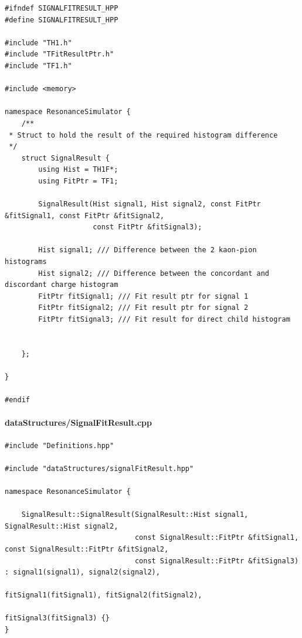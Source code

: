 \documentclass[12pt, a4paper]{article}
\begin{document}
\begin{verbatim}
#ifndef SIGNALFITRESULT_HPP
#define SIGNALFITRESULT_HPP

#include "TH1.h"
#include "TFitResultPtr.h"
#include "TF1.h"

#include <memory>

namespace ResonanceSimulator {
    /**
 * Struct to hold the result of the required histogram difference
 */
    struct SignalResult {
        using Hist = TH1F*;
        using FitPtr = TF1;

        SignalResult(Hist signal1, Hist signal2, const FitPtr &fitSignal1, const FitPtr &fitSignal2,
                     const FitPtr &fitSignal3);

        Hist signal1; /// Difference between the 2 kaon-pion histograms
        Hist signal2; /// Difference between the concordant and discordant charge histogram
        FitPtr fitSignal1; /// Fit result ptr for signal 1
        FitPtr fitSignal2; /// Fit result ptr for signal 2
        FitPtr fitSignal3; /// Fit result for direct child histogram


    };

}

#endif
\end{verbatim}

\paragraph{dataStructures/SignalFitResult.cpp}
\begin{verbatim}
#include "Definitions.hpp"

#include "dataStructures/signalFitResult.hpp"

namespace ResonanceSimulator {

    SignalResult::SignalResult(SignalResult::Hist signal1, SignalResult::Hist signal2,
                               const SignalResult::FitPtr &fitSignal1, const SignalResult::FitPtr &fitSignal2,
                               const SignalResult::FitPtr &fitSignal3) : signal1(signal1), signal2(signal2),
                                                                         fitSignal1(fitSignal1), fitSignal2(fitSignal2),
                                                                         fitSignal3(fitSignal3) {}
}
\end{verbatim}
\end{document}
